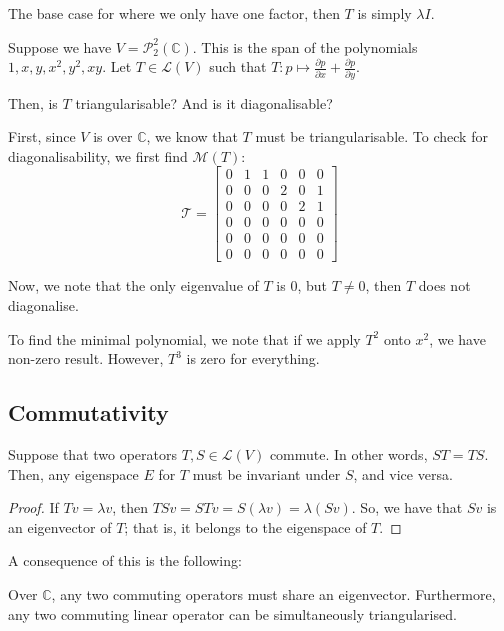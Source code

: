 \documentclass[openany]{book}
\newcommand{\CC}{\mathbb{C}}
\begin{document}
\begin{rmk}
	The base case for where we only have one factor, then $T$ is simply $\lambda I$.
\end{rmk}

\begin{example}
	Suppose we have $V = \mathscr{P}_{2}^{2} (\CC)$. This is the span of the polynomials $1, x, y, x^{2}, y^{2}, xy$. Let $T \in \mathcal L(V)$ such that $T : p \mapsto \frac{\partial p}{\partial x} + \frac{\partial p}{\partial y}$.
	
	Then, is $T$ triangularisable? And is it diagonalisable?
	
	First, since $V$ is over $\CC$, we know that $T$ must be triangularisable. To check for diagonalisability, we first find $\mathcal{M}(T)$:
	\begin{equation*}
		\mathcal{T} =
		\begin{bmatrix}
			0 & 1 & 1 & 0 & 0 & 0 \\
			0 & 0 & 0 & 2 & 0 & 1 \\
			0 & 0 & 0 & 0 & 2 & 1 \\
			0 & 0 & 0 & 0 & 0 & 0 \\
			0 & 0 & 0 & 0 & 0 & 0 \\
			0 & 0 & 0 & 0 & 0 & 0
		\end{bmatrix}
	\end{equation*}

	Now, we note that the only eigenvalue of $T$ is $0$, but $T \neq 0$, then $T$ does not diagonalise. 
	
	To find the minimal polynomial, we note that if we apply $T^{2}$ onto $x^{2}$, we have non-zero result. However, $T^{3}$ is zero for everything.
\end{example}

\subsection{Commutativity}
\begin{thm}
	Suppose that two operators $T,S \in \mathcal L(V)$ commute. In other words, $ST = TS$. Then, any eigenspace $E$ for $T$ must be invariant under $S$, and vice versa.
\end{thm}
\begin{proof}
	If $Tv = \lambda v$, then $TSv = STv = S(\lambda v) = \lambda(Sv)$. So, we have that $Sv$ is an eigenvector of $T$; that is, it belongs to the eigenspace of $T$.
\end{proof}

A consequence of this is the following:
\begin{cor}
	Over $\CC$, any two commuting operators must share an eigenvector. Furthermore, any two commuting linear operator can be simultaneously triangularised.
\end{cor}
\end{document}
